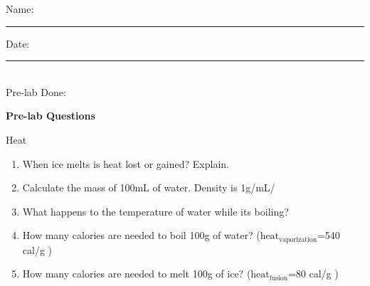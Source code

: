 \documentclass[main.tex]{subfiles}
\begin{document}
\newpage
\setdoublesep{0.35700 em}  %
\setatomsep{1.78500 em}    %
\setbondoffset{0.18265 em} %
\newcommand{\bondwidth}{0.06642 em} %
\setbondstyle{line width = \bondwidth}

\begin{fullwidth}





\begin{multicols}{2}
\begin{tcolorbox}[enhanced jigsaw,breakable,size=title,
colback=mybrown!05,colframe=black,fonttitle=\bfseries,
title=STUDENT INFO,pad at break=1mm, break at=15cm/0pt ]
\vspace{0.2cm}
\noindent Name: \rule{5cm}{0.4pt}Date:\rule{1cm}{0.4pt}\\
Pre-lab Done: \quad
\end{tcolorbox}
\end{multicols}
\hfill
\vspace{0.2cm}
\begin{center}
{\large \bfseries 
Pre-lab Questions 
\par
\Huge
Heat
\\[5pt] \par}
\vspace{0.2cm}
\end{center}
\par
\noindent
\uline{  \hfill \normalsize \hfill       }

\begin{enumerate}
\item When ice melts is heat lost or gained? Explain.
\vspace{2cm}

\item Calculate the mass of 100mL of water. Density is 1g/mL/
\vspace{2cm}

\item What happens to the temperature of water while its boiling?
\vspace{2cm}

\item How many calories are needed to boil 100g of water? ($\text{heat}_{\text{vaporization}}$=540 cal/g )
\vspace{2cm}


\item How many calories are needed to melt 100g of ice? ($\text{heat}_{\text{fusion}}$=80 cal/g )
\vspace{2cm}



\end{enumerate}
\end{fullwidth}
\end{document}
